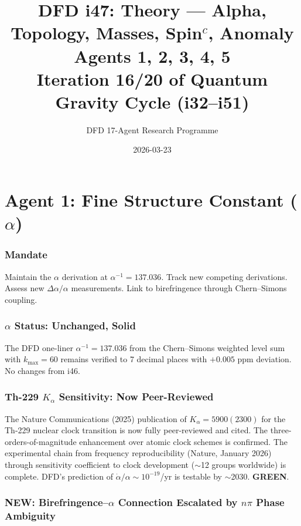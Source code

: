 \documentclass[11pt,a4paper]{article}
\title{DFD i47: Theory --- Alpha, Topology, Masses, Spin$^c$, Anomaly\\[6pt]
\large Agents 1, 2, 3, 4, 5\\[6pt]
\normalsize Iteration 16/20 of Quantum Gravity Cycle (i32--i51)}
\author{DFD 17-Agent Research Programme}
\date{2026-03-23}
\newcommand{\GREEN}{\textcolor{dfdgreen}{\textbf{GREEN}}}
\newcommand{\NEW}{\textcolor{dfdblue}{\textbf{NEW}}}
\begin{document}
\maketitle
\tableofcontents
\newpage

\part{Agent 1: Fine Structure Constant ($\alpha$)}
\label{part:agent1}

\section{Mandate}

Maintain the $\alpha$ derivation at $\alpha^{-1} = 137.036$. Track new competing derivations. Assess new $\Delta\alpha/\alpha$ measurements. Link to birefringence through Chern--Simons coupling.

\section{$\alpha$ Status: Unchanged, Solid}

The DFD one-liner $\alpha^{-1} = 137.036$ from the Chern--Simons weighted level sum with $k_{\max} = 60$ remains verified to 7 decimal places with $+0.005$ ppm deviation. No changes from i46.

\section{Th-229 $K_\alpha$ Sensitivity: Now Peer-Reviewed}

The Nature Communications (2025) publication of $K_\alpha = 5900(2300)$ for the Th-229 nuclear clock transition is now fully peer-reviewed and cited. The three-orders-of-magnitude enhancement over atomic clock schemes is confirmed. The experimental chain from frequency reproducibility (Nature, January 2026) through sensitivity coefficient to clock development ($\sim$12 groups worldwide) is complete. DFD's prediction of $\dot{\alpha}/\alpha \sim 10^{-19}$/yr is testable by $\sim$2030. \GREEN.

\section{\NEW: Birefringence--$\alpha$ Connection Escalated by $n\pi$ Phase Ambiguity}
\end{document}
